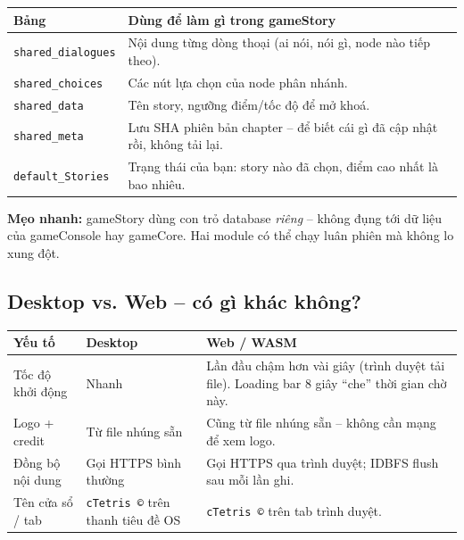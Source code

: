 \documentclass[12pt,a4paper]{article}
\renewcommand{\tipbox}[1]{%
  \vspace{4pt}%
  \noindent\colorbox{yellow!18}{\begin{minipage}{0.96\linewidth}%
    \vspace{2pt}\textbf{Mẹo nhanh:} #1\vspace{2pt}%
  \end{minipage}}%
  \vspace{4pt}%
}
\begin{document}
\vspace{6pt}
\begin{tabularx}{\linewidth}{|l|X|}
    \hline
    \textbf{Bảng}              & \textbf{Dùng để làm gì trong gameStory} \\
    \hline
    \texttt{shared\_dialogues} & Nội dung từng dòng thoại (ai nói, nói gì,
                                 node nào tiếp theo). \\
    \hline
    \texttt{shared\_choices}   & Các nút lựa chọn của node phân nhánh. \\
    \hline
    \texttt{shared\_data}      & Tên story, ngưỡng điểm/tốc độ để mở khoá. \\
    \hline
    \texttt{shared\_meta}      & Lưu SHA phiên bản chapter -- để biết cái gì
                                 đã cập nhật rồi, không tải lại. \\
    \hline
    \texttt{default\_Stories}  & Trạng thái của bạn: story nào đã chọn,
                                 điểm cao nhất là bao nhiêu. \\
    \hline
\end{tabularx}

\tipbox{gameStory dùng con trỏ database \textit{riêng} -- không đụng
tới dữ liệu của gameConsole hay gameCore. Hai module có thể chạy luân
phiên mà không lo xung đột.}

\subsection{Desktop vs. Web -- có gì khác không?}

\vspace{4pt}
\begin{tabularx}{\linewidth}{|l|l|X|}
    \hline
    \textbf{Yếu tố}         & \textbf{Desktop}      & \textbf{Web / WASM} \\
    \hline
    Tốc độ khởi động        & Nhanh                 & Lần đầu chậm hơn vài giây
                                                      (trình duyệt tải file). Loading bar
                                                      8 giây ``che'' thời gian chờ này. \\
    \hline
    Logo + credit           & Từ file nhúng sẵn     & Cũng từ file nhúng sẵn --
                                                      không cần mạng để xem logo. \\
    \hline
    Đồng bộ nội dung        & Gọi HTTPS bình thường & Gọi HTTPS qua trình duyệt;
                                                      IDBFS flush sau mỗi lần ghi. \\
    \hline
    Tên cửa sổ / tab        & \texttt{cTetris \copyright} trên thanh tiêu đề OS &
                               \texttt{cTetris \copyright} trên tab trình duyệt. \\
    \hline
\end{tabularx}
\end{document}
